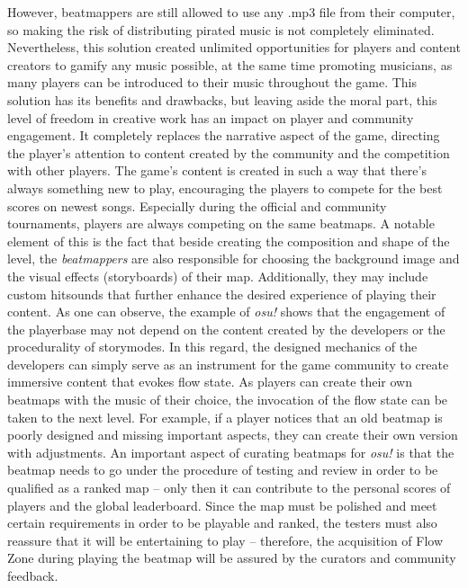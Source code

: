 However, beatmappers are still allowed to use any .mp3 file from their computer, so making the risk of distributing pirated music is not completely eliminated. Nevertheless, this solution created unlimited opportunities for players and content creators to gamify any music possible, at the same time promoting musicians, as many players can be introduced to their music throughout the game. This solution has its benefits and drawbacks, but leaving aside the moral part, this level of freedom in creative work has an impact on player and community engagement. It completely replaces the narrative aspect of the game, directing the player’s attention to content created by the community and the competition with other players. The game’s content is created in such a way that there’s always something new to play, encouraging the players to compete for the best scores on newest songs. Especially during the official and community tournaments, players are always competing on the same beatmaps. A notable element of this is the fact that beside creating the composition and shape of the level, the \textit{beatmappers} are also responsible for choosing the background image and the visual effects (storyboards) of their map. Additionally, they may include custom hitsounds that further enhance the desired experience of playing their content. As one can observe, the example of \textit{osu!} shows that the engagement of the playerbase may not depend on the content created by the developers or the procedurality of storymodes. In this regard, the designed mechanics of the developers can simply serve as an instrument for the game community to create immersive content that evokes flow state. As players can create their own beatmaps with the music of their choice, the invocation of the flow state can be taken to the next level. For example, if a player notices that an old beatmap is poorly designed and missing important aspects, they can create their own version with adjustments. An important aspect of curating beatmaps for \textit{osu!} is that the beatmap needs to go under the procedure of testing and review in order to be qualified as a ranked map -- only then it can contribute to the personal scores of players and the global leaderboard. Since the map must be polished and meet certain requirements in order to be playable and ranked, the testers must also reassure that it will be entertaining to play -- therefore, the acquisition of Flow Zone during playing the beatmap will be assured by the curators and community feedback. 

